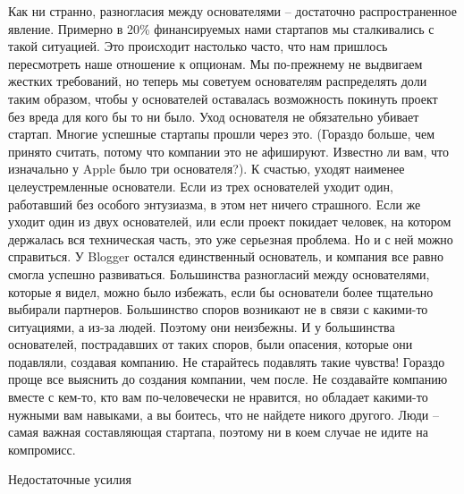 \documentclass[ebook,12pt,oneside,openany]{memoir}
\begin{document}
Как ни странно, разногласия между основателями – достаточно
распространенное явление. Примерно в 20\% финансируемых нами стартапов
мы сталкивались с такой ситуацией. Это происходит настолько часто, что
нам пришлось пересмотреть наше отношение к опционам. Мы по-прежнему не
выдвигаем жестких требований, но теперь мы советуем основателям
распределять доли таким образом, чтобы у основателей оставалась
возможность покинуть проект без вреда для кого бы то ни было. Уход
основателя не обязательно убивает стартап. Многие успешные стартапы
прошли через это. (Гораздо больше, чем принято считать, потому что
компании это не афишируют. Известно ли вам, что изначально у Apple
было три основателя?). К счастью, уходят наименее целеустремленные
основатели. Если из трех основателей уходит один, работавший без
особого энтузиазма, в этом нет ничего страшного. Если же уходит один
из двух основателей, или если проект покидает человек, на котором
держалась вся техническая часть, это уже серьезная проблема. Но и с
ней можно справиться. У Blogger остался единственный основатель, и
компания все равно смогла успешно развиваться. Большинства разногласий
между основателями, которые я видел, можно было избежать, если бы
основатели более тщательно выбирали партнеров. Большинство споров
возникают не в связи с какими-то ситуациями, а из-за людей. Поэтому
они неизбежны. И у большинства основателей, пострадавших от таких
споров, были опасения, которые они подавляли, создавая компанию. Не
старайтесь подавлять такие чувства! Гораздо проще все выяснить до
создания компании, чем после. Не создавайте компанию вместе с кем-то,
кто вам по-человечески не нравится, но обладает какими-то нужными вам
навыками, а вы боитесь, что не найдете никого другого. Люди – самая
важная составляющая стартапа, поэтому ни в коем случае не идите на
компромисс.

Недостаточные усилия
\end{document}
